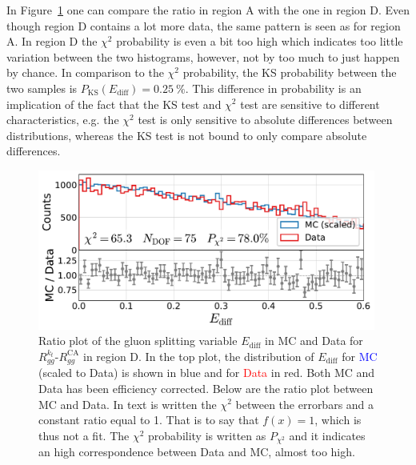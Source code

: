 In Figure~\ref{fig:q:ratio_plot_E_diff_region_D} one can compare the ratio in region A with the one in region D. Even though region D contains a lot more data, the same pattern is seen as for region A. In region D the $\chi^2$ probability is even a bit too high which indicates too little variation between the two histograms, however, not by too much to just happen by chance. In comparison to the $\chi^2$ probability, the KS probability between the two samples is $P_\mathrm{KS}(E_\mathrm{diff})=\SI{0.25}{\percent}$. This difference in probability is an implication of the fact that the KS test and $\chi^2$ test are sensitive to different characteristics, e.g. the $\chi^2$ test is only sensitive to absolute differences between distributions, whereas the KS test is not bound to only compare absolute differences. 

\begin{figure}
  \centerfloat
  \includegraphics[width=0.99\textwidth, trim=0 0 0 0, clip]{figures/quarks/cut_region_D_ratio_plot-down_sample=1.00-ML_vars=vertex-selection=b-ejet_min=4-n_iter_RS_lgb=99-n_iter_RS_xgb=9-cdot_cut=0.90-version=19-njet=4.pdf}
  \caption[Ratio Plot of $E_\mathrm{diff}$ in MC and Data for $R_{gg}^{k_t}$-$R_{gg}^\mathrm{CA}$ for Region D]
          {Ratio plot of the gluon splitting variable $E_\mathrm{diff}$ in MC and Data for $R_{gg}^{k_t}$-$R_{gg}^\mathrm{CA}$ in region D. In the top plot, the distribution of $E_\mathrm{diff}$ for \textcolor{blue}{MC} (scaled to Data) is shown in blue and for \textcolor{red}{Data} in red. Both MC and Data has been efficiency corrected. Below are the ratio plot between MC and Data. In text is written the $\chi^2$ between the errorbars and a constant ratio equal to \num{1}. That is to say that $f(x)=1$, which is thus not a fit. The $\chi^2$ probability is written as $P_{\chi^2}$ and it indicates an high correspondence between Data and MC, almost too high.} 
  \label{fig:q:ratio_plot_E_diff_region_D}
\end{figure}

